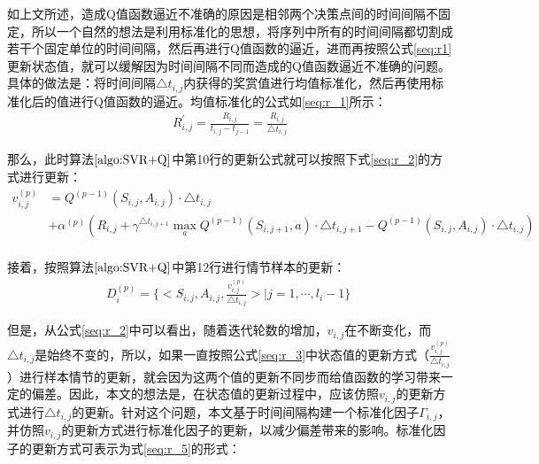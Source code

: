 如上文所述，造成Q值函数逼近不准确的原因是相邻两个决策点间的时间间隔不固定，所以一个自然的想法是利用标准化的思想，将序列中所有的时间间隔都切割成若干个固定单位的时间间隔，然后再进行Q值函数的逼近，进而再按照公式\eqref{seq:r1}更新状态值，就可以缓解因为时间间隔不同而造成的Q值函数逼近不准确的问题。具体的做法是：将时间间隔$\triangle t_{i,j}$内获得的奖赏值进行均值标准化，然后再使用标准化后的值进行Q值函数的逼近。均值标准化的公式如\eqref{seq:r_1}所示：
\begin{equation}\label{seq:r_1}
\begin{aligned}
R_{i, j}^{'}=\frac{R_{i,j}}{t_{i,j}-t_{j-1}}=\frac{R_{i,j}}{\triangle t_{i,j}}
\end{aligned}
\end{equation}

那么，此时算法$\ref{algo:SVR+Q}$中第10行的更新公式就可以按照下式\eqref{seq:r_2}的方式进行更新：
\begin{equation}\label{seq:r_2}
\begin{aligned}
v_{i,j}^{(p)}&=Q^{(p-1)}(S_{i,j},A_{i,j}) \cdot \triangle t_{i,j} \\
&+  \alpha^{(p)} (R_{i,j} + \gamma^{\triangle t_{i,j+1}} \max_{a} Q^{(p-1)}(S_{i,j+1},a) \cdot \triangle t_{i,j+1} -Q^{(p-1)}(S_{i,j},A_{i,j}) \cdot \triangle t_{i,j} )\\
\end{aligned}
\end{equation}

接着，按照算法$\ref{algo:SVR+Q}$中第12行进行情节样本的更新：
\begin{equation}\label{seq:r_3}
\begin{aligned}
D_{i}^{(p)}=\{<S_{i,j}, A_{i,j}, \frac{v_{i,j}^{(p)}}{\triangle t_{i,j}}>|j=1,\cdots,l_{i}-1\}\;
\end{aligned}
\end{equation}

但是，从公式\eqref{seq:r_2}中可以看出，随着迭代轮数的增加，$v_{i,j}$在不断变化，而$\triangle t_{i,j}$是始终不变的，所以，如果一直按照公式\eqref{seq:r_3}中状态值的更新方式（$\frac{v_{i,j}^{(p)}}{\triangle t_{i,j}}$）进行样本情节的更新，就会因为这两个值的更新不同步而给值函数的学习带来一定的偏差。因此，本文的想法是，在状态值的更新过程中，应该仿照$v_{i,j}$的更新方式进行$\triangle t_{i,j}$的更新。针对这个问题，本文基于时间间隔构建一个标准化因子$\Gamma_{i,j}$，并仿照$v_{i,j}$的更新方式进行标准化因子的更新，以减少偏差带来的影响。标准化因子的更新方式可表示为式\eqref{seq:r_5}的形式：

